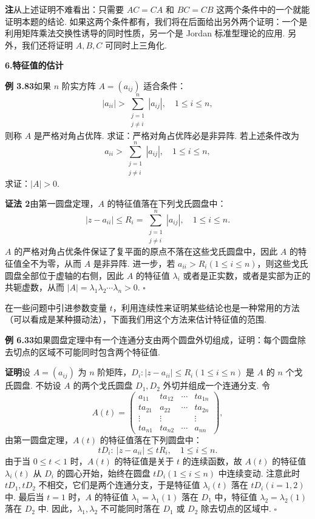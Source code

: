\documentclass[UTF8, 12pt, fontset=fandol, oneside]{ctexart}
\begin{document}
\noindent\textbf{注}\quad 从上述证明不难看出：只需要 $AC=CA$ 和 $BC=CB$ 这两个条件中的一个就能证明本题的结论. 如果这两个条件都有，我们将在后面给出另外两个证明：一个是利用矩阵乘法交换性诱导的同时性质，另一个是 Jordan 标准型理论的应用. 另外，我们还将证明 $A,B,C$ 可同时上三角化.

\noindent\textbf{6.\quad 特征值的估计}

\noindent\textbf{例 3.83}\quad 如果 $n$ 阶实方阵 $A=(a_{ij})$ 适合条件：
\[
|a_{ii}|>\sum_{\substack{j=1\\j\ne i}}^n |a_{ij}|,\quad 1\le i\le n,
\]
则称 $A$ 是严格对角占优阵. 求证：严格对角占优阵必是非异阵. 若上述条件改为
\[
a_{ii}>\sum_{\substack{j=1\\j\ne i}}^n |a_{ij}|,\quad 1\le i\le n,
\]
求证：$|A|>0$.

\noindent\textbf{证法 2}\quad 由第一圆盘定理，$A$ 的特征值落在下列戈氏圆盘中：
\[
|z-a_{ii}|\le R_i=\sum_{\substack{j=1\\j\ne i}}^n |a_{ij}|,\quad 1\le i\le n.
\]
$A$ 的严格对角占优条件保证了复平面的原点不落在这些戈氏圆盘中，因此 $A$ 的特征值全不为零，从而 $A$ 是非异阵. 进一步，若 $a_{ii}>R_i(1\le i\le n)$，则这些戈氏圆盘全部位于虚轴的右侧，因此 $A$ 的特征值 $\lambda_i$ 或者是正实数，或者是实部为正的共轭虚数，从而 $|A|=\lambda_1\lambda_2\cdots\lambda_n>0$. $\square$

在一些问题中引进参数变量 $t$，利用连续性来证明某些结论也是一种常用的方法（可以看成是某种摄动法），下面我们用这个方法来估计特征值的范围.

\noindent\textbf{例 6.33}\quad 如果圆盘定理中有一个连通分支由两个圆盘外切组成，证明：每个圆盘除去切点的区域不可能同时包含两个特征值.

\noindent\textbf{证明}\quad 设 $A=(a_{ij})$ 为 $n$ 阶矩阵，$D_i:|z-a_{ii}|\le R_i(1\le i\le n)$ 是 $A$ 的 $n$ 个戈氏圆盘. 不妨设 $A$ 的两个戈氏圆盘 $D_1,D_2$ 外切并组成一个连通分支. 令
\[
A(t)=\left(\begin{array}{cccc}
a_{11} & ta_{12} & \cdots & ta_{1n}\\
ta_{21} & a_{22} & \cdots & ta_{2n}\\
\vdots & \vdots & & \vdots\\
ta_{n1} & ta_{n2} & \cdots & a_{nn}
\end{array}\right),
\]
由第一圆盘定理，$A(t)$ 的特征值落在下列圆盘中：
\[
tD_i:\ |z-a_{ii}|\le tR_i,\quad 1\le i\le n.
\]
由于当 $0\le t<1$ 时，$A(t)$ 的特征值是关于 $t$ 的连续函数，故 $A(t)$ 的特征值 $\lambda_i(t)$ 从 $D_i$ 的圆心开始，始终在圆盘 $tD_i(1\le i\le n)$ 中连续变动. 注意此时 $tD_1,tD_2$ 不相交，它们是两个连通分支，于是特征值 $\lambda_i(t)$ 落在 $tD_i(i=1,2)$ 中. 最后当 $t=1$ 时，$A$ 的特征值 $\lambda_1=\lambda_1(1)$ 落在 $D_1$ 中，特征值 $\lambda_2=\lambda_2(1)$ 落在 $D_2$ 中. 因此，$\lambda_1,\lambda_2$ 不可能同时落在 $D_1$ 或 $D_2$ 除去切点的区域中. $\square$
\end{document}

